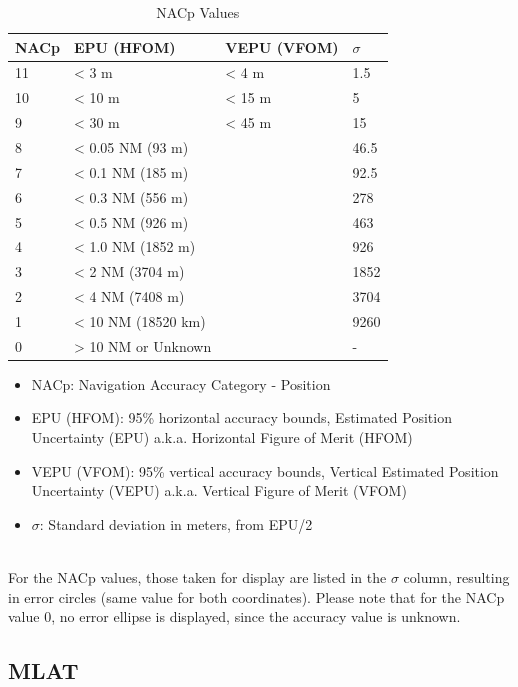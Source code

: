 \begin{table}[H]
  \center
  \begin{tabular}{ | l | l | l | l |}
    \hline
    \textbf{NACp} & \textbf{EPU (HFOM)} & \textbf{VEPU (VFOM)} & \textbf{$\sigma$} \\ \hline
    11  & < 3 m              & < 4 m  & 1.5 \\ \hline
    10  & < 10 m             & < 15 m & 5 \\ \hline
    9   & < 30 m             & < 45 m & 15 \\ \hline
    8   & < 0.05 NM (93 m)   & & 46.5 \\ \hline
    7   & < 0.1 NM (185 m)   & & 92.5 \\ \hline
    6   & < 0.3 NM (556 m)   & & 278 \\ \hline
    5   & < 0.5 NM (926 m)   & & 463 \\ \hline
    4   & < 1.0 NM (1852 m)  & & 926 \\ \hline
    3   & < 2 NM (3704 m)    & & 1852 \\ \hline
    2   & < 4 NM (7408 m)    & & 3704 \\ \hline
    1   & < 10 NM (18520 km) & & 9260 \\ \hline
    0   & > 10 NM or Unknown & & - \\ \hline
  \end{tabular}
  \caption{NACp Values}
\end{table}

\begin{itemize}
\item NACp: Navigation Accuracy Category - Position
\item EPU (HFOM): 95\% horizontal accuracy bounds, Estimated Position Uncertainty (EPU) a.k.a. Horizontal Figure of Merit (HFOM)
\item VEPU (VFOM): 95\% vertical accuracy bounds, Vertical Estimated Position Uncertainty (VEPU) a.k.a. Vertical Figure of Merit (VFOM)
\item $\sigma$: Standard deviation in meters, from EPU/2
\end{itemize}
\ \\

For the NACp values, those taken for display are listed in the $\sigma$ column, resulting in error circles (same value for both coordinates). Please note that for the NACp value 0, no error ellipse is displayed, since the accuracy value is unknown.

\subsection{MLAT}

